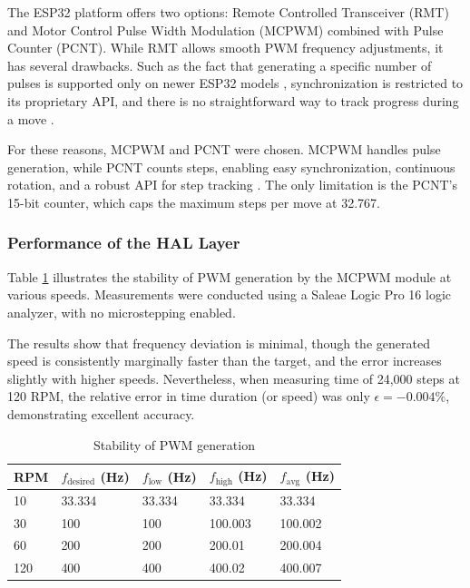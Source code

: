 The ESP32 platform offers two options: Remote Controlled Transceiver (RMT) and Motor Control Pulse Width Modulation (MCPWM) combined with Pulse Counter (PCNT).
While RMT allows smooth PWM frequency adjustments, it has several drawbacks.
Such as the fact that generating a specific number of pulses is supported only on newer ESP32 models \cite{gitRMT}, synchronization is restricted to its proprietary API, and there is no straightforward way to track progress during a move \cite{espRMT}.

For these reasons, MCPWM and PCNT were chosen.
MCPWM handles pulse generation, while PCNT counts steps, enabling easy synchronization, continuous rotation, and a robust API for step tracking \cite{espPCNT}.
The only limitation is the PCNT’s 15-bit counter, which caps the maximum steps per move at 32.767.


\subsubsection{Performance of the HAL Layer}

Table \ref{tab:performancepwm} illustrates the stability of PWM generation by the MCPWM module at various speeds.
Measurements were conducted using a Saleae Logic Pro 16 logic analyzer, with no microstepping enabled.

The results show that frequency deviation is minimal, though the generated speed is consistently marginally faster than the target, and  the error increases slightly with higher speeds.
Nevertheless, when measuring time of 24,000 steps at 120 RPM, the relative error in time duration (or speed) was only $\epsilon = -0.004\%$, demonstrating excellent accuracy.


\begin{table}[h!]
  \centering
  \caption[Stability of PWM generation]{Stability of PWM generation}
  \begin{tabular}{| m{2cm} || m{2.5cm} | m{2.5cm} | m{2.5cm} | m{2.5cm} |}
    \hline
    RPM & $f_{\mathrm{desired}}$ (Hz) & $f_{\mathrm{low}}$ (Hz) & $f_{\mathrm{high}}$ (Hz) & $f_\mathrm{avg}$ (Hz) \\
    \hline
    10  & 33.334                      & 33.334                  & 33.334                   & 33.334                \\
    30  & 100                         & 100                     & 100.003                  & 100.002               \\
    60  & 200                         & 200                     & 200.01                   & 200.004               \\
    120 & 400                         & 400                     & 400.02                   & 400.007               \\
    \hline
  \end{tabular}
  \label{tab:performancepwm}
\end{table}

